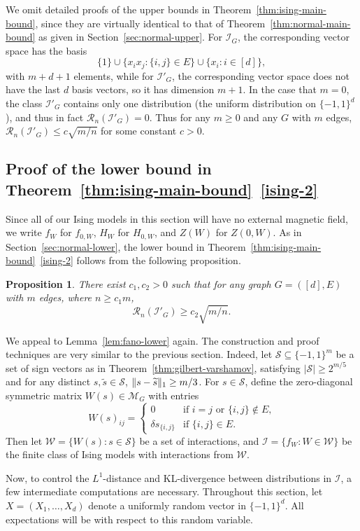 \documentclass[letterpaper]{amsart}
\DeclarePairedDelimiter{\norm}{\lVert}{\rVert}
\newcommand{\sW}{\mathcal{W}}
\newcommand{\sS}{\mathcal{S}}
\newcommand{\sI}{\mathcal{I}}
\newcommand{\sR}{\mathcal{R}}
\newcommand{\sM}{\mathcal{M}}
\let\originalleft\left
\let\originalright\right
\def\left#1{\mathopen{}\originalleft#1}
\def\right#1{\originalright#1\mathclose{}}
\newcommand{\seclabel}[1]{\label{sec:#1}}
\newcommand{\secref}[1]{\mbox{Section~\ref{sec:#1}}}
\newcommand{\thmref}[1]{Theorem~\ref{thm:#1}}
\numberwithin{thm}{section}
\newcommand{\lemref}[1]{Lemma~\ref{lem:#1}}
\newtheorem{prop}[thm]{Proposition}{\bfseries}{\itshape}
\newcommand{\proplabel}[1]{\label{prop:#1}}
\theoremstyle{definition}
\theoremstyle{plain}
\renewcommand{\tilde}[1]{\widetilde{#1}}
\begin{document}
We omit detailed proofs of the upper bounds in
\thmref{ising-main-bound}, since they are virtually identical to that
of \thmref{normal-main-bound} as given in \secref{normal-upper}.  For
$\sI_G$, the corresponding vector space has the basis
\[
  \{1\} \cup \{x_i x_j \colon \{i, j\} \in E\} \cup \{x_i \colon i\in[d]\} ,
\]
with $m + d + 1$ elements, while for $\sI'_G$, the corresponding
vector space does not have the last $d$ basis vectors, so it has
dimension $m + 1$. In the case that $m = 0$, the class $\sI'_G$
contains only one distribution (the uniform distribution on
$\{-1, 1\}^d$), and thus in fact $\sR_n(\sI'_G) = 0$. Thus for any
$m\geq0$ and any $G$ with $m$ edges, $\sR_n(\sI'_G) \le c \sqrt{ m/n}$
for some constant $c > 0$.

\subsection{Proof of the lower bound in \thmref{ising-main-bound}~\ref{ising-2}}\seclabel{ising-construction}
Since all of our Ising models in this section will have no external
magnetic field, we write $f_{W}$ for $f_{0, W}$, $H_W$ for $H_{0, W}$,
and $Z(W)$ for $Z(0, W)$.  As in \secref{normal-lower}, the lower
bound in \thmref{ising-main-bound}~\ref{ising-2} follows from the
following proposition.
\begin{prop}\proplabel{ising-lower-bound}
  There exist $c_1, c_2 > 0$ such that for any graph $G = ([d], E)$
  with $m$ edges, where $n \ge c_1 m$,
  \[
    \sR_n(\sI'_G) \ge c_2 \sqrt{m/n} .
  \]
\end{prop}
We appeal to \lemref{fano-lower} again. The construction and proof
techniques are very similar to the previous section. Indeed, let
$\sS \subseteq \{-1, 1\}^{m}$ be a set of sign vectors as in
\thmref{gilbert-varshamov}, satisfying $|\sS| \ge 2^{m/5}$ and for any
distinct $s, \tilde{s} \in \sS$, $\norm{s - \tilde{s}}_1 \ge m/3$. For
$s \in \sS$, define the zero-diagonal symmetric matrix
$W(s) \in \sM_G$ with entries
\[
  W(s)_{ij} = \left\{\begin{array}{ll}
               0 & \mbox{if $i=j$ or $\{i, j\} \not\in E$,} \\
               \delta s_{\{i, j\}} & \mbox{if $\{i, j\} \in E$.}
             \end{array} \right.
\]
Then let $\sW = \{ W(s) \colon s \in \sS \}$ be a set of interactions,
and $\sI = \{f_W \colon W \in \sW\}$ be the finite class of Ising
models with interactions from $\sW$.

Now, to control the $L^1$-distance and KL-divergence between
distributions in $\sI$, a few intermediate computations are
necessary. Throughout this section, let $X = (X_1, \dots, X_d)$ denote
a uniformly random vector in $\{-1, 1\}^d$.  All expectations will be
with respect to this random variable.
\end{document}
